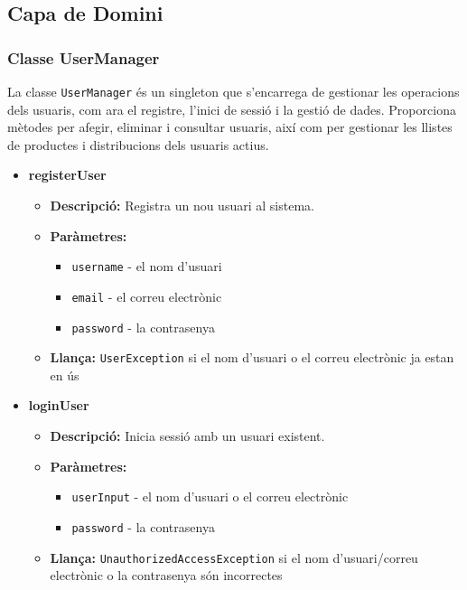 \documentclass[a4paper, t]{article}
\begin{document}
\subsection{Capa de Domini}

\subsubsection{Classe UserManager}
La classe \texttt{UserManager} és un singleton que s'encarrega de gestionar les operacions dels usuaris, com ara el registre, l'inici de sessió i la gestió de dades. Proporciona mètodes per afegir, eliminar i consultar usuaris, així com per gestionar les llistes de productes i distribucions dels usuaris actius.

\begin{itemize}
    \item \textbf{registerUser}
    \begin{itemize}
        \item \textbf{Descripció:} Registra un nou usuari al sistema.
        \item \textbf{Paràmetres:}
        \begin{itemize}
            \item \texttt{username} - el nom d'usuari
            \item \texttt{email} - el correu electrònic
            \item \texttt{password} - la contrasenya
        \end{itemize}
        \item \textbf{Llança:} \texttt{UserException} si el nom d'usuari o el correu electrònic ja estan en ús
    \end{itemize}

    \item \textbf{loginUser}
    \begin{itemize}
        \item \textbf{Descripció:} Inicia sessió amb un usuari existent.
        \item \textbf{Paràmetres:}
        \begin{itemize}
            \item \texttt{userInput} - el nom d'usuari o el correu electrònic
            \item \texttt{password} - la contrasenya
        \end{itemize}
        \item \textbf{Llança:} \texttt{UnauthorizedAccessException} si el nom d'usuari/correu electrònic o la contrasenya són incorrectes
    \end{itemize}


\end{itemize}
\end{document}
